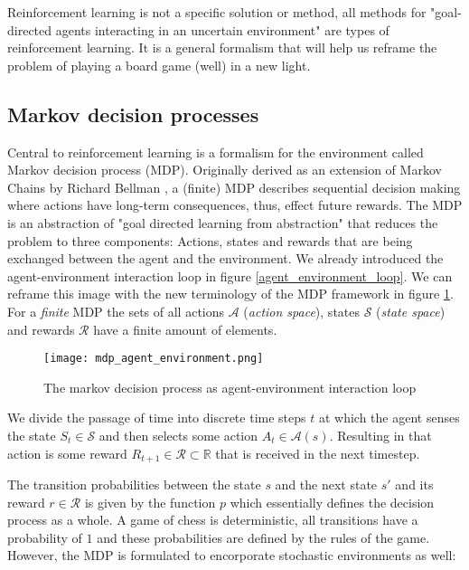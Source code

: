 Reinforcement learning is not a specific solution or method, all methods for "goal-directed agents interacting in an uncertain environment" \cite[p. 3]{sutton_reinforcement_2018} are types of reinforcement learning. It is a general formalism that will help us reframe the problem of playing a board game (well) in a new light.

\subsection{Markov decision processes}
Central to reinforcement learning is a formalism for the environment called Markov decision process (MDP). Originally derived as an extension of Markov Chains by Richard Bellman \cite{yang_markov_2019, bellman_markovian_1957}, a (finite) MDP describes sequential decision making where actions have long-term consequences, thus, effect future rewards. The MDP is an abstraction of "goal directed learning from abstraction" that reduces the problem to three components: Actions, states and rewards that are being exchanged between the agent and the environment. We already introduced the agent-environment interaction loop in figure \ref{agent_environment_loop}. We can reframe this image with the new terminology of the MDP framework in figure \ref{mdp_agent_environment}. For a \textit{finite} MDP the sets of all actions $ \mathcal{A}$ (\textit{action space}), states $\mathcal{S}$ (\textit{state space}) and rewards $ \mathcal{R} $ have a finite amount of elements.

\begin{figure}
    \centering
    \texttt{[image: mdp\_agent\_environment.png]}
    \caption{The markov decision process as agent-environment interaction loop}
    \label{mdp_agent_environment}
\end{figure}

We divide the passage of time into discrete time steps $ t $ at which the agent senses the state $ S_t \in \mathcal{S} $ and then selects some action $ A_t \in \mathcal{A}(s) $. Resulting in that action is some reward $ R_{t+1} \in \mathcal{R} \subset \mathbb{R} $ that is received in the next timestep.

The transition probabilities between the state $ s $ and the next state $ s' $ and its reward $r \in \mathcal{R}$ is given by the function $ p $ which essentially defines the decision process as a whole. A game of chess is deterministic, all transitions have a probability of $1$ and these probabilities are defined by the rules of the game. However, the MDP is formulated to encorporate stochastic environments as well:

